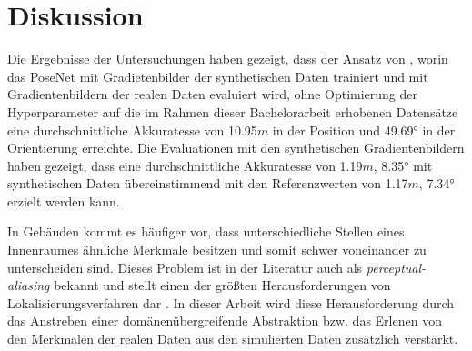 
\section{Diskussion}
\label{sec:kapitel_5}





Die Ergebnisse der Untersuchungen haben gezeigt, dass der Ansatz von \citet{acharyaBIMPoseNetIndoorCamera2019}, worin das PoseNet mit Gradietenbilder der synthetischen Daten trainiert und mit Gradientenbildern der realen Daten evaluiert wird, ohne Optimierung der Hyperparameter auf die im Rahmen dieser Bachelorarbeit erhobenen Datensätze eine durchschnittliche Akkuratesse von 10.95$m$ in der Position und 49.69° in der Orientierung erreichte. Die Evaluationen mit den synthetischen Gradientenbildern haben gezeigt, dass eine durchschnittliche Akkuratesse von 1.19$m$, 8.35° mit synthetischen Daten übereinstimmend mit den Referenzwerten von 1.17$m$, 7.34° erzielt werden kann.

In Gebäuden kommt es häufiger vor, dass unterschiedliche Stellen eines Innenraumes ähnliche Merkmale besitzen und somit schwer voneinander zu unterscheiden sind. Dieses Problem ist in der Literatur auch als \textit{perceptual-aliasing} bekannt und stellt einen der größten Herausforderungen von Lokalisierungsverfahren dar \cite{lowryVisualPlaceRecognition2016}. In dieser Arbeit wird diese Herausforderung durch das Anstreben einer domänenübergreifende Abstraktion bzw. das Erlenen von den Merkmalen der realen Daten aus den simulierten Daten zusätzlich verstärkt.


